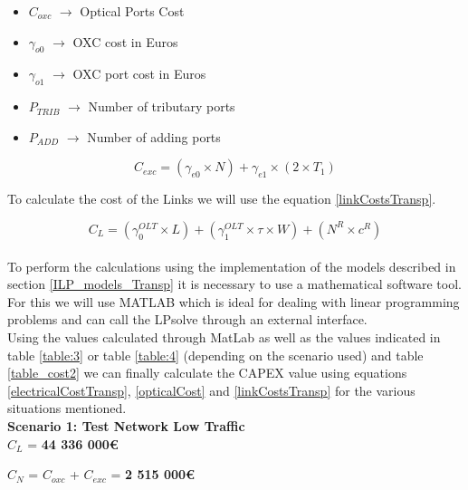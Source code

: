 \begin{itemize}
\item{$C_{oxc}$		$\rightarrow$	Optical Ports Cost}
\item{$\gamma_{o0}$	$\rightarrow$	OXC cost in Euros}
\item{$\gamma_{o1}$	$\rightarrow$	OXC port cost in Euros}
\item{$P_{TRIB}	$	$\rightarrow$	Number of tributary ports}
\item{$P_{ADD} $	$\rightarrow$	Number of adding ports}
\end{itemize}

\begin{equation}
C_{exc} = \left(\gamma_{e0}\times N\right) + \gamma_{e1} \times \left(2 \times T_1 \right)		\label{electricalCostTransp}
\end{equation}

\vspace{10pt}

To calculate the cost of the Links we will use the equation \ref{linkCostsTransp}.

\begin{equation}
C_L = \left(\gamma_0^{OLT} \times L\right) + \left(\gamma_1^{OLT} \times \tau \times W\right) + \left(N^R \times c^R\right)
\label{linkCostsTransp}
\end{equation} \\
	
To perform the calculations using the implementation of the models described in section \ref{ILP_models_Transp} it is necessary to use a mathematical software tool. For this we will use MATLAB which is ideal for dealing with linear programming problems and can call the LPsolve through an external interface. \\

Using the values calculated through MatLab as well as the values indicated in table \ref{table:3} or table \ref{table:4} (depending on the scenario used) and table \ref{table_cost2} we can finally calculate the CAPEX value using equations \ref{electricalCostTransp}, \ref{opticalCost} and \ref{linkCostsTransp} for the various situations mentioned.\\


\textbf{Scenario 1: Test Network Low Traffic} \label{Scenario1_transp} \\

$C_L$ = \textbf{44 336 000\euro}

$C_N$ = $C_{oxc}$ + $C_{exc}$ = \textbf{2 515 000\euro}

